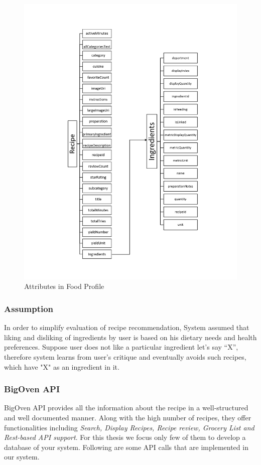 \begin{figure}[h]
	\centering
	\includegraphics[width=.7\linewidth]{figures/ch2_food_profile.png}
	\caption{Attributes in Food Profile} 
	\label{fig:ch2_food_profile}
\end{figure}

\subsubsection{Assumption}

In order to simplify evaluation of recipe recommendation, System assumed that liking and disliking of ingredients by user is based on his dietary needs and health preferences. Suppose user does not like a particular ingredient let’s say “X”, therefore system learns from user’s critique and eventually avoids such recipes, which have "X" as an ingredient in it.

\subsubsection{BigOven API}

BigOven API provides all the information about the recipe in a well-structured and well documented manner. Along with the high number of recipes, they offer functionalities including  \textit{Search, Display Recipes, Recipe review, Grocery List and Rest-based API support}. For this thesis we focus only few of them to develop a database of your system.  Following are some API calls that are implemented in our system.


